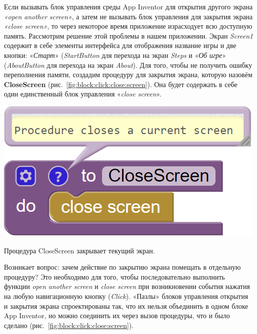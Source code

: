 Если вызывать блок управления среды App Inventor для открытия другого экрана \textit{«open another screen»}, а затем не вызывать блок управления для закрытия экрана \textit{«close screen»}, то через некоторое время приложение израсходует всю доступную память.
Рассмотрим решение этой проблемы в нашем приложении. Экран \textit{Screen1} содержит в себе элементы интерфейса для отображения название игры и две кнопки: «\textit{Старт}» (\textit{StartButton} для перехода на экран \textit{Steps} и «\textit{Об игре}» (\textit{AboutButton} для перехода на экран \textit{About}). Для того, чтобы не получить ошибку переполнения памяти, создадим процедуру для закрытия экрана, которую назовём \textbf{CloseScreen} (рис.~\ref{fig:block:click:close:screen}). Она будет содержать в себе один единственный блок управления «\textit{close screen}». 
\begin{marginfigure}[-2em]
  \includegraphics{./graphics/programs/guess_numbers/procedure_closeScreen_AppInventor_2018.png}
    \caption[Процедура CloseScreen.]{Процедура CloseScreen закрывает текущий экран.}
  \label{fig:block:click:close:screen}
\end{marginfigure}
Возникает вопрос: зачем действие по закрытию экрана помещать в отдельную процедуру? Это необходимо для того, чтобы последовательно выполнить функции \textit{open another screen} и \textit{close screen} при возникновении события нажатия на любую навигационную кнопку (\textit{Click}). «Пазлы» блоков управления открытия и закрытия экрана спроектированы так, что их нельзя объединить в одном блоке App Inventor, но можно соединить их через вызов процедуры, что и было сделано (рис.~\ref{fig:block:click:close:screen}).

